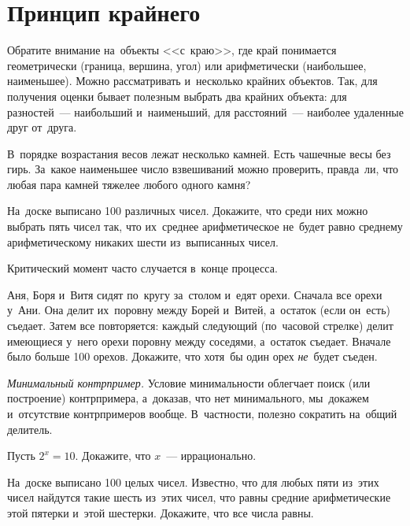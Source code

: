 
\section*{Принцип крайнего}



Обратите внимание на~объекты <<с~краю>>, где край понимается геометрически
(граница, вершина, угол) или арифметически (наибольшее, наименьшее).
Можно рассматривать и~несколько крайних объектов.
Так, для получения оценки бывает полезным выбрать два крайних объекта: для
разностей~--- наибольший и~наименьший, для расстояний~--- наиболее удаленные
друг от~друга.

\begin{problems}

\item
В~порядке возрастания весов лежат несколько камней.
Есть чашечные весы без гирь.
За~какое наименьшее число взвешиваний можно проверить, правда~ли, что любая пара
камней тяжелее любого одного камня?

\item
На~доске выписано 100 различных чисел.
Докажите, что среди них можно выбрать пять чисел так, что их~среднее
арифметическое не~будет равно среднему арифметическому никаких шести
из~выписанных чисел.

\end{problems}

Критический момент часто случается в~конце процесса.

\begin{problems}

\item
Аня, Боря и~Витя сидят по~кругу за~столом и~едят орехи.
Сначала все орехи у~Ани.
Она делит их~поровну между Борей и~Витей, а~остаток (если он~есть) съедает.
Затем все повторяется: каждый следующий (по~часовой стрелке) делит имеющиеся
у~него орехи поровну между соседями, а~остаток съедает.
Вначале было больше 100 орехов.
Докажите, что хотя~бы один орех \emph{не}~будет съеден.

\end{problems}

\emph{Минимальный контрпример.}
Условие минимальности облегчает поиск (или построение) контрпримера, а~доказав,
что нет минимального, мы~докажем и~отсутствие контрпримеров вообще.
В~частности, полезно сократить на~общий делитель.

\begin{problems}

\item
Пусть $2^x = 10$.
Докажите, что $x$~--- иррационально.

\item
На~доске выписано 100 целых чисел.
Известно, что для любых пяти из~этих чисел найдутся такие шесть из~этих чисел,
что равны средние арифметические этой пятерки и~этой шестерки.
Докажите, что все числа равны.

\end{problems}


